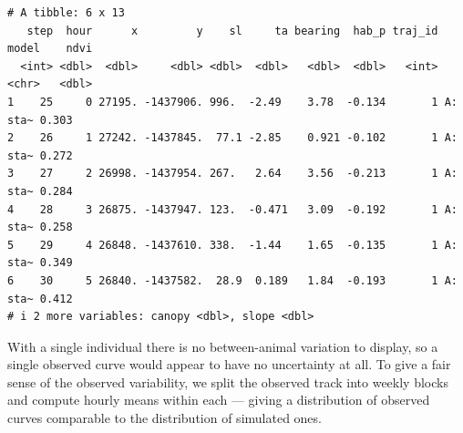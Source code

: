 \documentclass[
  letterpaper,
  DIV=11,
  numbers=noendperiod]{scrartcl}
\begin{document}
\begin{verbatim}
# A tibble: 6 x 13
   step  hour      x         y    sl     ta bearing  hab_p traj_id model    ndvi
  <int> <dbl>  <dbl>     <dbl> <dbl>  <dbl>   <dbl>  <dbl>   <int> <chr>   <dbl>
1    25     0 27195. -1437906. 996.  -2.49    3.78  -0.134       1 A: sta~ 0.303
2    26     1 27242. -1437845.  77.1 -2.85    0.921 -0.102       1 A: sta~ 0.272
3    27     2 26998. -1437954. 267.   2.64    3.56  -0.213       1 A: sta~ 0.284
4    28     3 26875. -1437947. 123.  -0.471   3.09  -0.192       1 A: sta~ 0.258
5    29     4 26848. -1437610. 338.  -1.44    1.65  -0.135       1 A: sta~ 0.349
6    30     5 26840. -1437582.  28.9  0.189   1.84  -0.193       1 A: sta~ 0.412
# i 2 more variables: canopy <dbl>, slope <dbl>
\end{verbatim}

With a single individual there is no between-animal variation to
display, so a single observed curve would appear to have no uncertainty
at all. To give a fair sense of the observed variability, we split the
observed track into weekly blocks and compute hourly means within each
--- giving a distribution of observed curves comparable to the
distribution of simulated ones.
\end{document}
